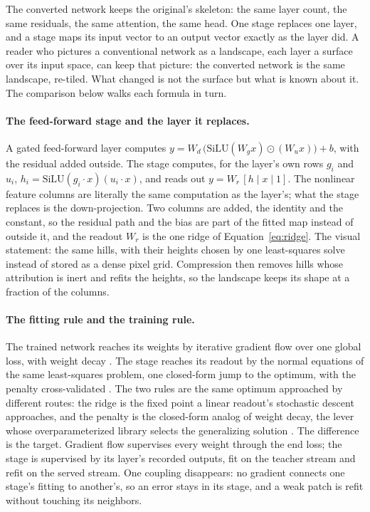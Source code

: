 \documentclass[11pt]{article}
\begin{document}
The converted network keeps the original's skeleton: the same
layer count, the same residuals, the same attention, the same
head. One stage replaces one layer, and a stage maps its input
vector to an output vector exactly as the layer did. A reader who
pictures a conventional network as a landscape, each layer a
surface over its input space, can keep that picture: the converted
network is the same landscape, re-tiled. What changed is not the
surface but what is known about it. The comparison below walks
each formula in turn.

\paragraph{The feed-forward stage and the layer it replaces.}
A gated feed-forward layer computes
$y = W_d\,\bigl(\mathrm{SiLU}(W_g x) \odot (W_u x)\bigr) + b$,
with the residual added outside. The stage computes, for the
layer's own rows $g_i$ and $u_i$,
$h_i = \mathrm{SiLU}(g_i \cdot x)(u_i \cdot x)$, and reads out
$y = W_r\,[h \mid x \mid 1]$. The nonlinear feature columns are
literally the same computation as the layer's; what the stage
replaces is the down-projection. Two columns are added, the
identity and the constant, so the residual path and the bias are
part of the fitted map instead of outside it, and the readout
$W_r$ is the one ridge of Equation~\ref{eq:ridge}. The visual
statement: the same hills, with their heights chosen by one
least-squares solve instead of stored as a dense pixel grid.
Compression then removes hills whose attribution is inert and
refits the heights, so the landscape keeps its shape at a
fraction of the columns.

\paragraph{The fitting rule and the training rule.}
The trained network reaches its weights by iterative gradient
flow over one global loss, with weight decay
\cite{adam2015}. The stage reaches its readout by the normal
equations of the same least-squares problem, one closed-form jump
to the optimum, with the penalty cross-validated
\cite{hoerl1970}. The two rules are the same optimum approached
by different routes: the ridge is the fixed point a linear
readout's stochastic descent approaches, and the penalty is the
closed-form analog of weight decay, the lever whose
overparameterized library selects the generalizing solution
\cite{nanda2023}. The difference is the target. Gradient flow
supervises every weight through the end loss; the stage is
supervised by its layer's recorded outputs, fit on the teacher
stream and refit on the served stream. One coupling disappears:
no gradient connects one stage's fitting to another's, so an
error stays in its stage, and a weak patch is refit without
touching its neighbors.
\end{document}
